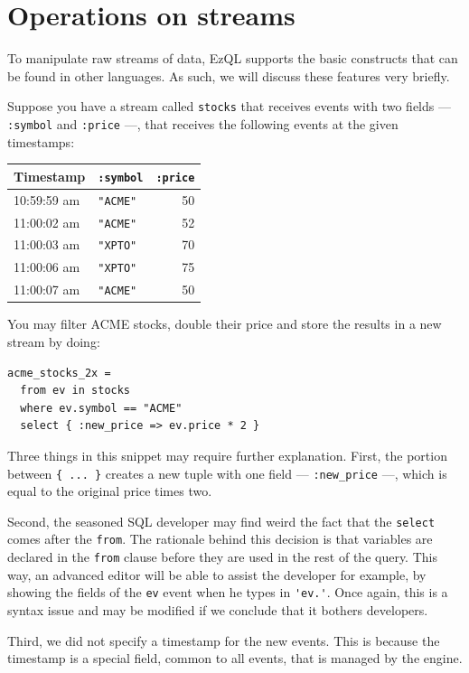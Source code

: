 \documentclass{report}
\begin{document}
\section{Operations on streams}
\label{sec:stream-operations}

To manipulate raw streams of data, EzQL supports the basic constructs
that can be found in other languages. As such, we will discuss these
features very briefly.

Suppose you have a stream called \verb=stocks= that receives events
with two fields --- \verb=:symbol= and \verb=:price= ---, that
receives the following events at the given timestamps:

\begin{tabular}{ |l|l|r| }
  \hline
  Timestamp & \verb=:symbol= & \verb=:price= \\
  \hline
  10:59:59 am & \verb="ACME"= & 50 \\
  11:00:02 am & \verb="ACME"= & 52 \\
  11:00:03 am & \verb="XPTO"= & 70 \\
  11:00:06 am & \verb="XPTO"= & 75 \\
  11:00:07 am & \verb="ACME"= & 50 \\
  \hline
\end{tabular}

You may filter ACME stocks, double their price and store the results
in a new stream by doing:

\begin{lstlisting}
acme_stocks_2x =
  from ev in stocks
  where ev.symbol == "ACME"
  select { :new_price => ev.price * 2 }
\end{lstlisting}

Three things in this snippet may require further explanation. First,
the portion between \verb={ ... }= creates a new tuple with one field
--- \verb=:new_price= ---, which is equal to the original price times
two.

Second, the seasoned SQL developer may find weird the fact that the
\verb=select= comes after the \verb=from=. The rationale behind this
decision is that variables are declared in the \verb=from= clause
before they are used in the rest of the query. This way, an advanced
editor will be able to assist the developer for example, by showing
the fields of the \verb=ev= event when he types in \verb='ev.'=. Once
again, this is a syntax issue and may be modified if we conclude that
it bothers developers.

Third, we did not specify a timestamp for the new events. This is
because the timestamp is a special field, common to all events, that
is managed by the engine.
\end{document}
